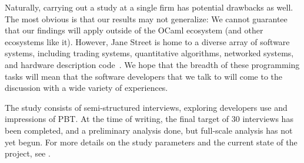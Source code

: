 Naturally, carrying out a study at a single firm has potential drawbacks as
well. The most obvious is that our results may not generalize: We
cannot guarantee that our findings will apply outside of the OCaml ecosystem (and
other ecosystems like it). However, Jane Street is home to a diverse array of
software systems, including trading systems, quantitative
algorithms, networked systems, and hardware description code~\cite{signalsandthreads}.
We hope that the breadth of these programming tasks will mean that the software
developers that we talk to will come to the discussion with a wide variety of
experiences.

The study consists of semi-structured interviews, exploring developers use and
impressions of PBT. At the time of writing, the final target of 30 interviews
has been completed, and a preliminary analysis done, but full-scale analysis has
not yet begun. For more details on the study parameters and the current state of
the project, see .



